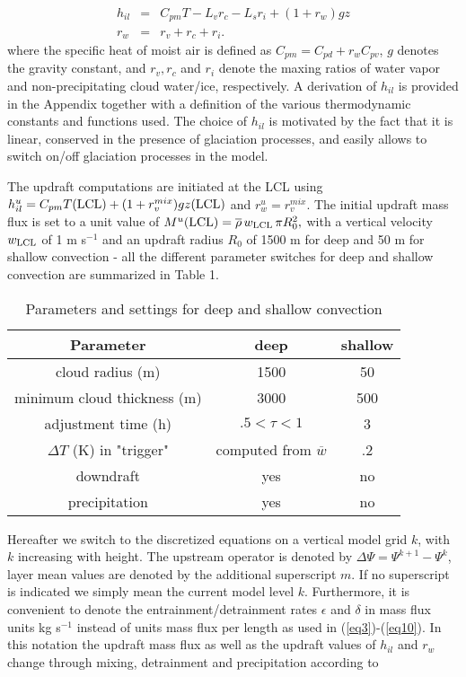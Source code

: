 \begin{eqnarray}
h_{il}&=& C_{pm} T - L_v r_c - L_s r_i + ( 1 + r_w ) g z\label{eqh}\\
r_w&=&r_v+r_c+r_i\label{eqr}.
\end{eqnarray}
\noindent
where the specific heat of moist air is defined as
$C_{pm}= C_{pd} + r_w C_{pv}$, $g$ denotes the gravity constant, and
$r_v, r_c$ and $r_i$ denote the maxing ratios of water vapor and
non-precipitating cloud water/ice, respectively.
 A derivation of
$h_{il}$ is provided in the Appendix together with a definition of the
various thermodynamic constants and functions used.
The choice of $h_{il}$  is motivated by the fact
that it is linear, conserved in the presence of glaciation
processes, and easily allows to switch on/off glaciation processes in
the model.

The updraft computations are initiated at the LCL using
$h_{il}^u=C_{pm} T({\rm LCL}) + ( 1 + r_v^{mix} ) g z({\rm LCL})$ and $r_w^u=
r_v^{mix}$. The initial updraft mass flux is set to a unit value of
$M^u({\rm LCL})=\overline{\rho}\,w_{\rm LCL}\,\pi R_0^2,$
with a vertical velocity $w_{\rm LCL}$ of 1 m s$^{-1}$ and
an updraft radius $R_0$ of 1500 m for deep and 50 m for shallow convection -
all the different parameter switches for deep and shallow convection are
summarized in Table 1.

\begin{table}
\caption{ Parameters and  settings for deep and shallow convection}
\label{table1}

\begin{center}
\begin{tabular}{||c|c|c||} \hline
{\bf Parameter} &{\bf deep}&\bf{shallow}\\
\hline \hline
cloud radius (m)&1500&50\\
minimum cloud thickness (m)&3000&500\\
adjustment time (h)&$.5 < \tau<1$&3\\
$\Delta T$ (K) in "trigger"&computed from $\overline{w}$&.2\\
downdraft&yes&no\\
precipitation&yes&no\\
\hline
\hline
\end{tabular}
\end{center}
\end{table}

Hereafter we switch to the discretized equations
on a vertical model grid $k$, with $k$ increasing with height.
The upstream operator is denoted by $\Delta\Psi=\Psi^{k+1}-\Psi^k$,
layer mean values are denoted by the additional superscript $m$.
If no superscript
is indicated we simply mean the current model level $k$. Furthermore, it
is convenient to denote the entrainment/detrainment rates $\epsilon$
and $\delta$ in mass flux units  kg s$^{-1}$ instead of units mass flux per
length as used in (\ref{eq3})-(\ref{eq10}).
In this notation the updraft mass flux as well as the updraft values of $h_{il}$
and $r_w$ change through mixing, detrainment and precipitation according to

